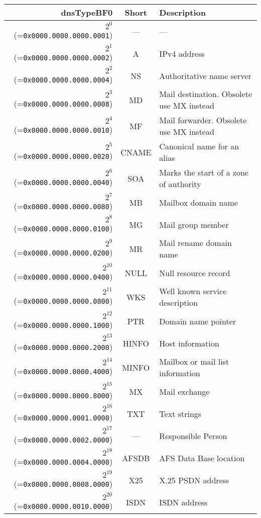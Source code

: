 \documentclass[documentation]{subfiles}
\begin{document}
\begin{longtable}{rcl}
    \toprule
    {\bf dnsTypeBF0} & {\bf Short} & {\bf Description}\\
    \midrule\endhead%
    $2^{0}$  (={\tt 0x0000.0000.0000.0001}) & --- & --- \\
    $2^{1}$  (={\tt 0x0000.0000.0000.0002}) & A & IPv4 address \\
    $2^{2}$  (={\tt 0x0000.0000.0000.0004}) & NS & Authoritative name server \\
    $2^{3}$  (={\tt 0x0000.0000.0000.0008}) & MD & Mail destination. Obsolete use MX instead \\
    $2^{4}$  (={\tt 0x0000.0000.0000.0010}) & MF & Mail forwarder. Obsolete use MX instead \\
    $2^{5}$  (={\tt 0x0000.0000.0000.0020}) & CNAME & Canonical name for an alias \\
    $2^{6}$  (={\tt 0x0000.0000.0000.0040}) & SOA & Marks the start of a zone of authority \\
    $2^{7}$  (={\tt 0x0000.0000.0000.0080}) & MB & Mailbox domain name \\
    $2^{8}$  (={\tt 0x0000.0000.0000.0100}) & MG & Mail group member \\
    $2^{9}$  (={\tt 0x0000.0000.0000.0200}) & MR & Mail rename domain name \\
    $2^{10}$ (={\tt 0x0000.0000.0000.0400}) & NULL & Null resource record \\
    $2^{11}$ (={\tt 0x0000.0000.0000.0800}) & WKS & Well known service description \\
    $2^{12}$ (={\tt 0x0000.0000.0000.1000}) & PTR & Domain name pointer \\
    $2^{13}$ (={\tt 0x0000.0000.0000.2000}) & HINFO & Host information \\
    $2^{14}$ (={\tt 0x0000.0000.0000.4000}) & MINFO & Mailbox or mail list information \\
    $2^{15}$ (={\tt 0x0000.0000.0000.8000}) & MX & Mail exchange \\
    $2^{16}$ (={\tt 0x0000.0000.0001.0000}) & TXT & Text strings \\
    $2^{17}$ (={\tt 0x0000.0000.0002.0000}) & --- & Responsible Person \\
    $2^{18}$ (={\tt 0x0000.0000.0004.0000}) & AFSDB & AFS Data Base location \\
    $2^{19}$ (={\tt 0x0000.0000.0008.0000}) & X25 & X.25 PSDN address \\
    $2^{20}$ (={\tt 0x0000.0000.0010.0000}) & ISDN & ISDN address \\

\end{longtable}
\end{document}
